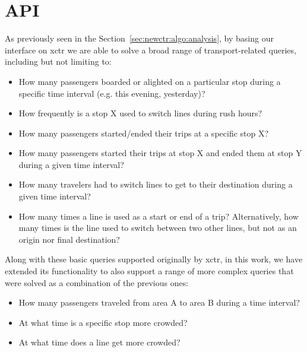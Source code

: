 	
	\section{API}
	\label{sec:api}
    As previously seen in the Section~\ref{sec:newctr:algo:analysis}, by basing our interface on \gls{xctr} we are able to solve a broad range of transport-related queries, including but not limiting to:

    \begin{itemize}
    \item How many passengers boarded or alighted on a particular stop during a specific time interval (e.g. this evening, yesterday)?
    \item How frequently is a stop X used to switch lines during rush hours?
    \item How many passengers started/ended their trips at a specific stop X?
    \item How many passengers started their trips at stop X and ended them at stop Y during a given time interval?
    \item How many travelers had to switch lines to get to their destination during a given time interval?
    \item How many times a line is used as a start or end of a trip? Alternatively, how many times is the line used to switch between two other lines, but not as an origin nor final destination?
    \end{itemize}
    
    Along with these basic queries supported originally by \gls{xctr}, in this work, we have extended its functionality to also support a range of more complex queries that were  solved as a combination of the previous ones:
    
    \begin{itemize}
        \item How many passengers traveled from area A to area B during a time interval? 
        \item At what time is a specific stop more crowded?
        \item At what time does a line get more crowded?
    \end{itemize}
    
